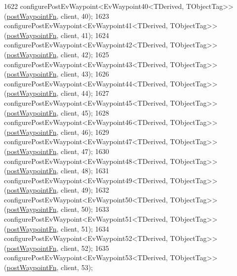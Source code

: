 \begin{DoxyCode}
1622     configurePostEvWaypoint<EvWaypoint40<TDerived, TObjectTag>>(\hyperlink{classcl__move__base__z_1_1WaypointEventDispatcher_a964a57fcce5d48ec60243230722d8dd7}{postWaypointFn}, client, 40);
1623     configurePostEvWaypoint<EvWaypoint41<TDerived, TObjectTag>>(\hyperlink{classcl__move__base__z_1_1WaypointEventDispatcher_a964a57fcce5d48ec60243230722d8dd7}{postWaypointFn}, client, 41);
1624     configurePostEvWaypoint<EvWaypoint42<TDerived, TObjectTag>>(\hyperlink{classcl__move__base__z_1_1WaypointEventDispatcher_a964a57fcce5d48ec60243230722d8dd7}{postWaypointFn}, client, 42);
1625     configurePostEvWaypoint<EvWaypoint43<TDerived, TObjectTag>>(\hyperlink{classcl__move__base__z_1_1WaypointEventDispatcher_a964a57fcce5d48ec60243230722d8dd7}{postWaypointFn}, client, 43);
1626     configurePostEvWaypoint<EvWaypoint44<TDerived, TObjectTag>>(\hyperlink{classcl__move__base__z_1_1WaypointEventDispatcher_a964a57fcce5d48ec60243230722d8dd7}{postWaypointFn}, client, 44);
1627     configurePostEvWaypoint<EvWaypoint45<TDerived, TObjectTag>>(\hyperlink{classcl__move__base__z_1_1WaypointEventDispatcher_a964a57fcce5d48ec60243230722d8dd7}{postWaypointFn}, client, 45);
1628     configurePostEvWaypoint<EvWaypoint46<TDerived, TObjectTag>>(\hyperlink{classcl__move__base__z_1_1WaypointEventDispatcher_a964a57fcce5d48ec60243230722d8dd7}{postWaypointFn}, client, 46);
1629     configurePostEvWaypoint<EvWaypoint47<TDerived, TObjectTag>>(\hyperlink{classcl__move__base__z_1_1WaypointEventDispatcher_a964a57fcce5d48ec60243230722d8dd7}{postWaypointFn}, client, 47);
1630     configurePostEvWaypoint<EvWaypoint48<TDerived, TObjectTag>>(\hyperlink{classcl__move__base__z_1_1WaypointEventDispatcher_a964a57fcce5d48ec60243230722d8dd7}{postWaypointFn}, client, 48);
1631     configurePostEvWaypoint<EvWaypoint49<TDerived, TObjectTag>>(\hyperlink{classcl__move__base__z_1_1WaypointEventDispatcher_a964a57fcce5d48ec60243230722d8dd7}{postWaypointFn}, client, 49);
1632     configurePostEvWaypoint<EvWaypoint50<TDerived, TObjectTag>>(\hyperlink{classcl__move__base__z_1_1WaypointEventDispatcher_a964a57fcce5d48ec60243230722d8dd7}{postWaypointFn}, client, 50);
1633     configurePostEvWaypoint<EvWaypoint51<TDerived, TObjectTag>>(\hyperlink{classcl__move__base__z_1_1WaypointEventDispatcher_a964a57fcce5d48ec60243230722d8dd7}{postWaypointFn}, client, 51);
1634     configurePostEvWaypoint<EvWaypoint52<TDerived, TObjectTag>>(\hyperlink{classcl__move__base__z_1_1WaypointEventDispatcher_a964a57fcce5d48ec60243230722d8dd7}{postWaypointFn}, client, 52);
1635     configurePostEvWaypoint<EvWaypoint53<TDerived, TObjectTag>>(\hyperlink{classcl__move__base__z_1_1WaypointEventDispatcher_a964a57fcce5d48ec60243230722d8dd7}{postWaypointFn}, client, 53);

\end{DoxyCode}
